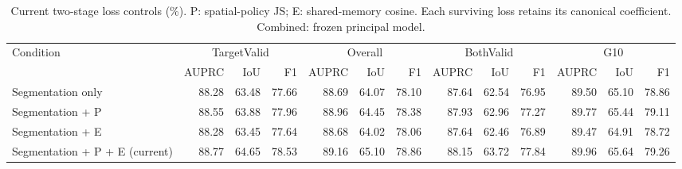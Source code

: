 \begin{table}[!t]
\caption{Current two-stage loss controls (\%). P: spatial-policy JS; E: shared-memory cosine. Each surviving loss retains its canonical coefficient. Combined: frozen principal model.}
\label{tab:loss_parts}
\centering\scriptsize
\setlength{\tabcolsep}{3pt}
\begin{tabular}{lrrrrrrrrrrrr}
\toprule
Condition & \multicolumn{3}{c}{TargetValid} & \multicolumn{3}{c}{Overall} & \multicolumn{3}{c}{BothValid} & \multicolumn{3}{c}{G10}\\
 & AUPRC & IoU & F1 & AUPRC & IoU & F1 & AUPRC & IoU & F1 & AUPRC & IoU & F1\\
\midrule
Segmentation only & 88.28 & 63.48 & 77.66 & 88.69 & 64.07 & 78.10 & 87.64 & 62.54 & 76.95 & 89.50 & 65.10 & 78.86\\
Segmentation + P & 88.55 & 63.88 & 77.96 & 88.96 & 64.45 & 78.38 & 87.93 & 62.96 & 77.27 & 89.77 & 65.44 & 79.11\\
Segmentation + E & 88.28 & 63.45 & 77.64 & 88.68 & 64.02 & 78.06 & 87.64 & 62.46 & 76.89 & 89.47 & 64.91 & 78.72\\
Segmentation + P + E (current) & 88.77 & 64.65 & 78.53 & 89.16 & 65.10 & 78.86 & 88.15 & 63.72 & 77.84 & 89.96 & 65.64 & 79.26\\
\bottomrule
\end{tabular}
\end{table}
